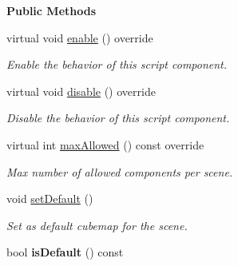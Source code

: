 \begin{Indent}\textbf{ Public Methods}\par
\begin{DoxyCompactItemize}
\item 
\mbox{\label{classrev_1_1_cube_map_component_ab221b2927cdd6f7a8a23e8a84d2452d3}} 
virtual void \mbox{\hyperlink{classrev_1_1_cube_map_component_ab221b2927cdd6f7a8a23e8a84d2452d3}{enable}} () override
\begin{DoxyCompactList}\small\item\em Enable the behavior of this script component. \end{DoxyCompactList}\item 
\mbox{\label{classrev_1_1_cube_map_component_ad96023b168ef5657d6df4ea0dba6d46a}} 
virtual void \mbox{\hyperlink{classrev_1_1_cube_map_component_ad96023b168ef5657d6df4ea0dba6d46a}{disable}} () override
\begin{DoxyCompactList}\small\item\em Disable the behavior of this script component. \end{DoxyCompactList}\item 
\mbox{\label{classrev_1_1_cube_map_component_a6270b3cb1d7252ff9f7542d5479edb5b}} 
virtual int \mbox{\hyperlink{classrev_1_1_cube_map_component_a6270b3cb1d7252ff9f7542d5479edb5b}{max\+Allowed}} () const override
\begin{DoxyCompactList}\small\item\em Max number of allowed components per scene. \end{DoxyCompactList}\item 
\mbox{\label{classrev_1_1_cube_map_component_aa2bd32ddaddbc14d8576b03c62ecd2a2}} 
void \mbox{\hyperlink{classrev_1_1_cube_map_component_aa2bd32ddaddbc14d8576b03c62ecd2a2}{set\+Default}} ()
\begin{DoxyCompactList}\small\item\em Set as default cubemap for the scene. \end{DoxyCompactList}\item 
\mbox{\label{classrev_1_1_cube_map_component_a9a41d565eac220baa0abfe0fa9ff9733}} 
bool {\bfseries is\+Default} () const

\end{DoxyCompactItemize}
\end{Indent}
